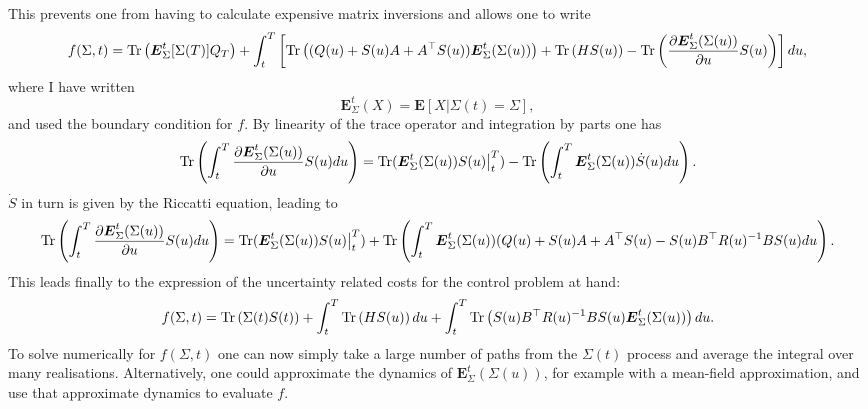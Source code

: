 This prevents one from having to calculate expensive matrix inversions and allows one to write
\[
f(\Sigma,t) =\operatorname{Tr}\left(\boldsymbol{E}^t_\Sigma[\Sigma(T)]Q_T\right) + \int_t^T\left[ \operatorname{Tr}\left((Q(u)+S(u)A + A^\top S(u))\boldsymbol{E}^t_{\Sigma}(\Sigma(u))\right) +\operatorname{Tr}\left(H S(u)\right)-\operatorname{Tr}\left( \frac{\partial \boldsymbol{E}^t_\Sigma(\Sigma(u))}{\partial u} S(u)\right)\right]du,
\]
where I have written
\[
\boldsymbol{E}^t_\Sigma(X) = \boldsymbol{E}[X|\Sigma(t)=\Sigma],
\]
and used the boundary condition for $f$.
By linearity of the trace operator and integration by parts one has
\[
\operatorname{Tr}\left(\int_t^T  \frac{\partial \boldsymbol{E}^t_\Sigma(\Sigma(u))}{\partial u} S(u)du\right) = \operatorname{Tr}(\boldsymbol{E}^t_\Sigma(\Sigma(u)) S(u)\big|_t^T) - \operatorname{Tr}\left(\int_t^T \boldsymbol{E}^t_\Sigma(\Sigma(u)) \dot{S}(u)du\right).
\]
$\dot{S}$ in turn is given by the Riccatti equation, leading to
\[
\operatorname{Tr}\left(\int_t^T  \frac{\partial \boldsymbol{E}^t_\Sigma(\Sigma(u))}{\partial u} S(u)du\right) = \operatorname{Tr}(\boldsymbol{E}^t_\Sigma(\Sigma(u)) S(u)\big|_t^T) + \operatorname{Tr}\left(\int_t^T \boldsymbol{E}^t_\Sigma(\Sigma(u))  (Q(u) + S(u) A + A^\top S(u) -S(u) B^\top R(u)^{-1} B S(u)du\right).
\]
This leads finally to the expression of the uncertainty related costs for the control problem at hand:
\begin{equation}
f(\Sigma,t)  = \operatorname{Tr}\left(\Sigma(t) S(t)\right) + \int_t^T \operatorname{Tr}\left(H S(u)\right)du+ \int_t^T \operatorname{Tr} \left(S(u) B^\top R(u)^{-1}B S(u) \boldsymbol{E}^t_\Sigma(\Sigma(u))\right) du.
\end{equation}
To solve numerically for $f(\Sigma,t)$ one can now simply take a large number of paths from the $\Sigma(t)$ process and average the integral over many realisations. Alternatively,
one could approximate the dynamics of $\boldsymbol{E}^t_\Sigma\left(\Sigma(u)\right)$, for example with a mean-field approximation, and use that approximate dynamics to evaluate
$f$.
